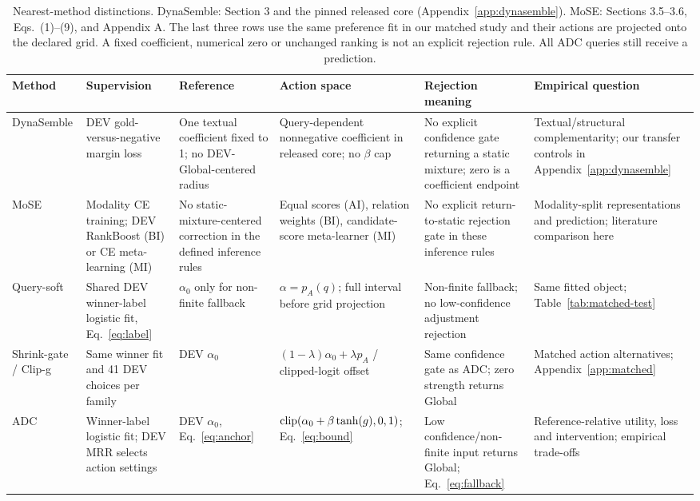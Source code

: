\begin{table}[htbp]
\centering\footnotesize\setlength{\tabcolsep}{3pt}
\caption{Nearest-method distinctions. DynaSemble: Section 3 and the pinned released core (Appendix~\ref{app:dynasemble}). MoSE: Sections 3.5--3.6, Eqs.~(1)--(9), and Appendix A. The last three rows use the same preference fit in our matched study and their actions are projected onto the declared grid. A fixed coefficient, numerical zero or unchanged ranking is not an explicit rejection rule. All ADC queries still receive a prediction.}
\label{tab:nearest-methods}
\begin{tabularx}{\linewidth}{@{}>{\raggedright\arraybackslash}p{.11\linewidth}>{\raggedright\arraybackslash}X>{\raggedright\arraybackslash}X>{\raggedright\arraybackslash}X>{\raggedright\arraybackslash}X>{\raggedright\arraybackslash}X@{}}
\toprule
Method & Supervision & Reference & Action space & Rejection meaning & Empirical question\\
\midrule
DynaSemble\newline\citep{dynasemble} & DEV gold-versus-negative margin loss & One textual coefficient fixed to 1; no DEV-Global-centered radius & Query-dependent nonnegative coefficient in released core; no $\beta$ cap & No explicit confidence gate returning a static mixture; zero is a coefficient endpoint & Textual/structural complementarity; our transfer controls in Appendix~\ref{app:dynasemble}\\[2pt]
MoSE~\citep{mose} & Modality CE training; DEV RankBoost (BI) or CE meta-learning (MI) & No static-mixture-centered correction in the defined inference rules & Equal scores (AI), relation weights (BI), candidate-score meta-learner (MI) & No explicit return-to-static rejection gate in these inference rules & Modality-split representations and prediction; literature comparison here\\[2pt]
Query-soft & Shared DEV winner-label logistic fit, Eq.~\eqref{eq:label} & $\alpha_0$ only for non-finite fallback & $\alpha=p_A(q)$; full interval before grid projection & Non-finite fallback; no low-confidence adjustment rejection & Same fitted object; Table~\ref{tab:matched-test}\\[2pt]
Shrink-gate / Clip-g & Same winner fit and 41 DEV choices per family & DEV $\alpha_0$ & $(1-\lambda)\alpha_0+\lambda p_A$ / clipped-logit offset & Same confidence gate as ADC; zero strength returns Global & Matched action alternatives; Appendix~\ref{app:matched}\\[2pt]
ADC & Winner-label logistic fit; DEV MRR selects action settings & DEV $\alpha_0$, Eq.~\eqref{eq:anchor} & $\operatorname{clip}(\alpha_0+\beta\tanh(g),0,1)$; Eq.~\eqref{eq:bound} & Low confidence/non-finite input returns Global; Eq.~\eqref{eq:fallback} & Reference-relative utility, loss and intervention; empirical trade-offs\\[2pt]
\bottomrule
\end{tabularx}
\end{table}
